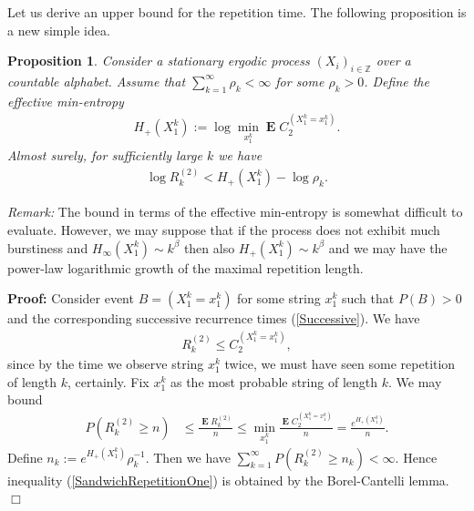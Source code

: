 \documentclass[a4paper,12pt]{article}
\DeclareMathOperator{\mean}{\mathbf{E}}
\newtheorem{proposition}{Proposition}
\newenvironment*{proof}{\begin{trivlist}\item[]
\noindent\textbf{Proof:}}{$\Box$\par\end{trivlist}}
\begin{document}
Let us derive an upper bound for the repetition time.  The following
proposition is a new simple idea.
\begin{proposition}
  \label{theoSandwichRepetitionOne}
  Consider a stationary ergodic process
  $(X_i)_{i\in\mathbb{Z}}$ over a countable alphabet. Assume that
  $\sum_{k=1}^\infty \rho_k<\infty$ for some $\rho_k>0$. Define the
  effective min-entropy
  \begin{align}
    H_+(X_1^k):=\log\min_{x_1^k} \mean C_2^{(X_1^k=x_1^k)}.
  \end{align}
  Almost surely, for sufficiently large $k$ we have
\begin{align}
  \label{SandwichRepetitionOne}
  \log R^{(2)}_k<H_+(X_1^k)-\log\rho_k
  .
\end{align}
\end{proposition}
\emph{Remark:}
The bound in terms of the effective min-entropy is somewhat difficult
to evaluate. However, we may suppose that if the process does not
exhibit much burstiness and $H_\infty(X_1^k)\sim k^\beta$ then also
$H_+(X_1^k)\sim k^\beta$ and we may have the power-law logarithmic
growth of the maximal repetition length.
\begin{proof}
  Consider event $B=(X_1^k=x_1^k)$ for some string $x_1^k$ such that
  $P(B)>0$ and the corresponding successive recurrence times
  (\ref{Successive}).  We have
  \begin{align}
    R^{(2)}_k\le C_2^{(X_1^k=x_1^k)},
  \end{align}
  since by the time we observe string $x_1^k$ twice, we must have seen
  some repetition of length $k$, certainly.  Fix $x_1^k$ as the most
  probable string of length $k$.  We may bound
  \begin{align}
    P(R^{(2)}_k\ge n)
    &\le \frac{\mean R^{(2)}_k}{n}
      \le \min_{x_1^k} \frac{\mean C^{(X_1^k=x_1^k)}_2}{n}
      = \frac{e^{H_+(X_1^k)}}{n}.
  \end{align}
  Define $n_k:=e^{H_+(X_1^k)}\rho_k^{-1}$. Then we have
  $\sum_{k=1}^\infty P(R^{(2)}_k\ge n_k)<\infty$. Hence inequality
  (\ref{SandwichRepetitionOne}) is obtained by the Borel-Cantelli
  lemma.
\end{proof}
\end{document}
